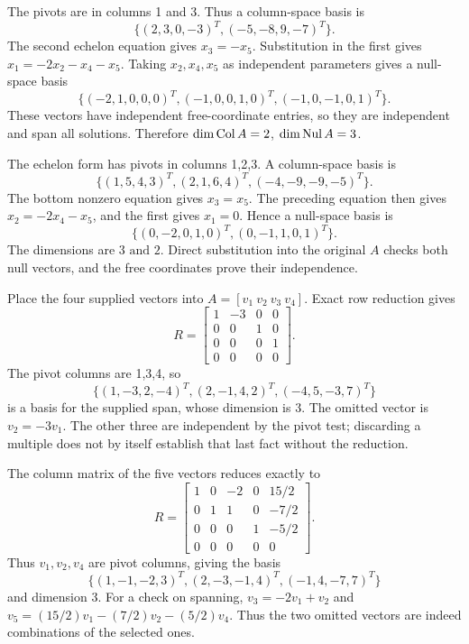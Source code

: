 The pivots are in columns 1 and 3. Thus a column-space basis is
\[
 \{(2,3,0,-3)^T,(-5,-8,9,-7)^T\}.
\]
The second echelon equation gives $x_3=-x_5$.
Substitution in the first gives $x_1=-2x_2-x_4-x_5$.
Taking $x_2,x_4,x_5$ as independent parameters gives a null-space basis
\[
 \{(-2,1,0,0,0)^T,(-1,0,0,1,0)^T,(-1,0,-1,0,1)^T\}.
\]
These vectors have independent free-coordinate entries, so they are independent
and span all solutions. Therefore $\dim\operatorname{Col} A=2$, $\dim\operatorname{Nul} A=3$.

The echelon form has pivots in columns 1,2,3. A column-space basis is
\[
 \{(1,5,4,3)^T,(2,1,6,4)^T,(-4,-9,-9,-5)^T\}.
\]
The bottom nonzero equation gives $x_3=x_5$.
The preceding equation then gives $x_2=-2x_4-x_5$,
and the first gives $x_1=0$. Hence a null-space basis is
\[
 \{(0,-2,0,1,0)^T,(0,-1,1,0,1)^T\}.
\]
The dimensions are $\boxed{3\text{ and }2}$. Direct substitution into
the original $A$ checks both null vectors, and the free coordinates prove
their independence.

Place the four supplied vectors into $A=[v_1\ v_2\ v_3\ v_4]$.
Exact row reduction gives
\[
 R=\begin{bmatrix}1&-3&0&0\\0&0&1&0\\0&0&0&1\\0&0&0&0\end{bmatrix}.
\]
The pivot columns are 1,3,4, so
\[
 \{(1,-3,2,-4)^T,(2,-1,4,2)^T,(-4,5,-3,7)^T\}
\]
is a basis for the supplied span, whose dimension is $3$.
The omitted vector is $v_2=-3v_1$. The other three are independent by
the pivot test; discarding a multiple does not by itself establish that
last fact without the reduction.

The column matrix of the five vectors reduces exactly to
\[
 R=\begin{bmatrix}1&0&-2&0&15/2\\0&1&1&0&-7/2\\
 0&0&0&1&-5/2\\0&0&0&0&0\end{bmatrix}.
\]
Thus $v_1,v_2,v_4$ are pivot columns, giving the basis
\[
 \{(1,-1,-2,3)^T,(2,-3,-1,4)^T,(-1,4,-7,7)^T\}
\]
and dimension $3$.
For a check on spanning, $v_3=-2v_1+v_2$ and
$v_5=(15/2)v_1-(7/2)v_2-(5/2)v_4$. Thus the two omitted vectors
are indeed combinations of the selected ones.


